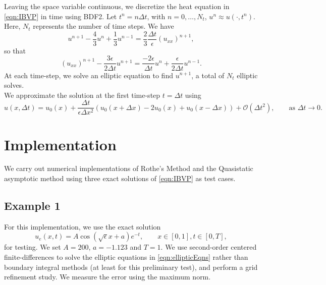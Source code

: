 \documentclass[11pt]{article}
\numberwithin{equation}{section}
\newcommand{\dt}{\Delta t}
\newcommand{\beq}{\begin{equation}}
\newcommand{\eeq}{\end{equation}}
\newcommand{\dx}{\Delta x}
\begin{document}
Leaving the space variable continuous, we discretize the heat equation in \eqref{eqn:IBVP} in time using BDF2. Let $t^n = n\dt$, with $n = 0, \dots, N_t$, $u^n \approx u(\cdot, t^n)$. Here, $N_t$ represents the number of time steps. We have
\begin{equation*}
u^{n+1} - \frac{4}{3}u^{n} + \frac{1}{3}u^{n - 1}  = \frac{2}{3}\frac{\dt}{\epsilon}(u_{xx})^{n+1}, 
\end{equation*}
so that 
\begin{equation}\label{eqn:ellipticEqns}
(u_{xx})^{n+1} - \frac{3\epsilon}{2\dt}u^{n+1} = \frac{-2\epsilon}{\dt}u^{n} + \frac{\epsilon}{2\dt}u^{n - 1}.
\end{equation}
At each time-step, we solve an elliptic equation to find $u^{n+1}$, a total of $N_t$ elliptic solves.\\

We approximate the solution at the first time-step $t = \dt$ using 
\beq
u(x, \dt) = u_0(x) +\frac{\dt}{\epsilon\dx^2}(u_0(x + \dx) - 2u_0(x) + u_0(x - \dx) ) + \mathcal{O}(\dt^2), \qquad \text{as }\dt\rightarrow 0. 
\eeq
\section{Implementation}\label{sec:implementation}
We carry out numerical implementations of Rothe's Method and the Quasistatic asymptotic method using three exact solutions of \eqref{eqn:IBVP} as test cases.
\subsection{Example 1}
For this implementation, we use the exact solution  
\begin{equation}
u_{e}(x,t) = A \cos(\sqrt{\epsilon} x + a)e^{-t}, \qquad x\in[0,1], t\in[0,T], 
\end{equation}
for testing. 
We set $A = 200$, $a = -1.123$ and $T = 1$. We use second-order centered finite-differences to solve the elliptic equations in \eqref{eqn:ellipticEqns} rather than boundary integral methods (at least for this preliminary test), and perform a grid refinement study. We measure the error using the maximum norm. \\
\end{document}
